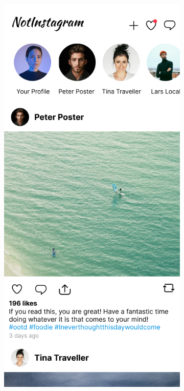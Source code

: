 \documentclass[a4paper, 12pt]{article}
\begin{document}
\begin{figure}[ht!]
  \begin{subfigure}{0.49\linewidth}
    \begin{center}
      \includegraphics[width=\linewidth, height=0.3\textheight, keepaspectratio,frame]{img/ig-clone/Feed.png}

\end{center}
\end{subfigure}
\end{figure}
\end{document}
